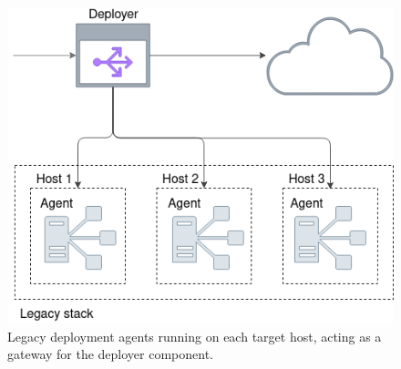 \documentclass[../main.tex]{subfiles}
\begin{document}
    \begin{figure}[ht]
        \centering
        \includegraphics[width=.7\linewidth]{img/concepts_deploy_legacy_v2.png}
        \captionsetup{justification=centering}
        \caption{
            Legacy deployment agents running on each target host, acting as a gateway for the deployer component.
        }
        \label{fig:depl_legacy}
    \end{figure}
\end{document}
